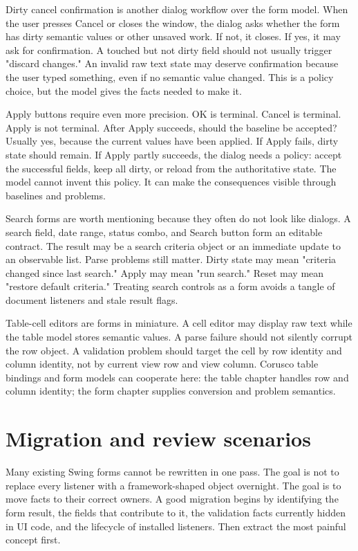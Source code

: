 Dirty cancel confirmation is another dialog workflow over the form model. When
the user presses Cancel or closes the window, the dialog asks whether the form
has dirty semantic values or other unsaved work. If not, it closes. If yes, it
may ask for confirmation. A touched but not dirty field should not usually
trigger "discard changes." An invalid raw text state may deserve confirmation
because the user typed something, even if no semantic value changed. This is a
policy choice, but the model gives the facts needed to make it.

Apply buttons require even more precision. OK is terminal. Cancel is terminal.
Apply is not terminal. After Apply succeeds, should the baseline be accepted?
Usually yes, because the current values have been applied. If Apply fails,
dirty state should remain. If Apply partly succeeds, the dialog needs a policy:
accept the successful fields, keep all dirty, or reload from the authoritative
state. The model cannot invent this policy. It can make the consequences
visible through baselines and problems.

Search forms are worth mentioning because they often do not look like dialogs.
A search field, date range, status combo, and Search button form an editable
contract. The result may be a search criteria object or an immediate update to
an observable list. Parse problems still matter. Dirty state may mean "criteria
changed since last search." Apply may mean "run search." Reset may mean
"restore default criteria." Treating search controls as a form avoids a tangle
of document listeners and stale result flags.

Table-cell editors are forms in miniature. A cell editor may display raw text
while the table model stores semantic values. A parse failure should not
silently corrupt the row object. A validation problem should target the cell by
row identity and column identity, not by current view row and view column.
Corusco table bindings and form models can cooperate here: the table chapter
handles row and column identity; the form chapter supplies conversion and
problem semantics.

\section{Migration and review scenarios}

Many existing Swing forms cannot be rewritten in one pass. The goal is not to
replace every listener with a framework-shaped object overnight. The goal is to
move facts to their correct owners. A good migration begins by identifying the
form result, the fields that contribute to it, the validation facts currently
hidden in UI code, and the lifecycle of installed listeners. Then extract the
most painful concept first.

